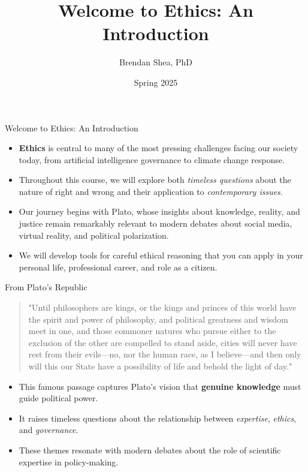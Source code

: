 \documentclass[aspectratio=169]{beamer}
\title{Welcome to Ethics: An Introduction}
\author{Brendan Shea, PhD}
\institute{Rochester Community and Technical College}
\date{Spring 2025}
\begin{document}
\begin{frame}
\titlepage
\end{frame}

\begin{frame}{Welcome to Ethics: An Introduction}
\begin{itemize}
\item \textbf{Ethics} is central to many of the most pressing challenges facing our society today, from artificial intelligence governance to climate change response.
\item Throughout this course, we will explore both \emph{timeless questions} about the nature of right and wrong and their application to \emph{contemporary issues}.
\item Our journey begins with Plato, whose insights about knowledge, reality, and justice remain remarkably relevant to modern debates about social media, virtual reality, and political polarization.
\item We will develop tools for careful ethical reasoning that you can apply in your personal life, professional career, and role as a citizen.
\end{itemize}
\end{frame}

\begin{frame}{From Plato's Republic}
\begin{quote}
\small
"Until philosophers are kings, or the kings and princes of this world have the spirit and power of philosophy, and political greatness and wisdom meet in one, and those commoner natures who pursue either to the exclusion of the other are compelled to stand aside, cities will never have rest from their evils—no, nor the human race, as I believe—and then only will this our State have a possibility of life and behold the light of day."
\end{quote}
\vspace{0.5cm}
\begin{itemize}
\item This famous passage captures Plato's vision that \textbf{genuine knowledge} must guide political power.
\item It raises timeless questions about the relationship between \emph{expertise}, \emph{ethics}, and \emph{governance}.
\item These themes resonate with modern debates about the role of scientific expertise in policy-making.
\end{itemize}
\end{frame}
\end{document}
